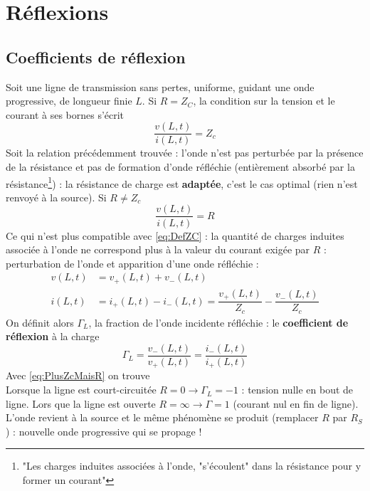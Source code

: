 \section{Réflexions}
	\subsection{Coefficients de réflexion}
	Soit une ligne de transmission sans pertes, uniforme, guidant une onde progressive, 
	de longueur finie $L$. Si $R=Z_C$, la condition sur la tension et le courant à ses 
	bornes s'écrit
	\begin{equation}
	\dfrac{v(L,t)}{i(L,t)} = Z_c
	\end{equation}
	Soit la relation précédemment trouvée : l'onde n'est pas perturbée par la présence de 
	la résistance et pas de formation d'onde réfléchie (entièrement absorbé par la 
	résistance\footnote{"Les charges induites associées à l'onde, "s'écoulent" dans la 
	résistance pour y former un courant"}) : la résistance de charge est \textbf{adaptée}, 
	c'est le cas optimal (rien n'est renvoyé à la source). Si $R\neq Z_c$ 
	\begin{equation}
	\dfrac{v(L,t)}{i(L,t)} = R
	\label{eq:PlusZcMaisR}
	\end{equation}
	Ce qui n'est plus compatible avec \autoref{eq:DefZC} : la quantité de charges induites 
	associée à l'onde ne correspond plus à la valeur du courant exigée par $R$ : perturbation 
	de l'onde et apparition d'une onde réfléchie :
	\begin{equation}
	\begin{array}{ll}
	v(L,t) &= v_+(L,t) + v_-(L,t)\\
	i(L,t) &= i_+(L,t) - i_-(L,t)	= \dfrac{v_+(L,t)}{Z_c}-\dfrac{v_-(L,t)}{Z_c}
	\end{array}
	\end{equation}
	On définit alors $\Gamma_L$, la fraction de l'onde incidente réfléchie : le 
	\textbf{coefficient de réflexion} à la charge
	\begin{equation}
	\Gamma_L = \dfrac{v_-(L,t)}{v_+(L,t)} = \dfrac{i_-(L,t)}{i_+(L,t)}
	\end{equation}
	Avec \autoref{eq:PlusZcMaisR} on trouve\\
	Lorsque la ligne est court-circuitée $R=0 \rightarrow \Gamma_L=-1$ : tension nulle en 
	bout de ligne. Lors que la ligne est ouverte $R=\infty \rightarrow \Gamma = 1$ (courant 
	nul en fin de ligne). L'onde revient à la source et le même phénomène se produit (remplacer 
	$R$ par $R_S$) : nouvelle onde progressive qui se propage !
	

